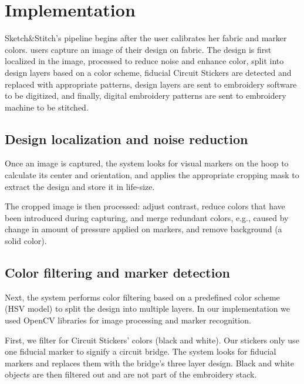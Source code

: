 \section{Implementation}
Sketch\&Stitch's pipeline begins after the user calibrates her fabric and marker colors. users capture an image of their design on fabric. The design is first localized in the image, processed to reduce noise and enhance color, split into design layers based on a color scheme, fiducial Circuit Stickers are detected and replaced with appropriate patterns, design layers are sent to embroidery software to be digitized, and finally, digital embroidery patterns are sent to embroidery machine to be stitched. 


\subsection{Design localization and noise reduction}
Once an image is captured, the system looks for visual markers on the hoop to calculate its center and orientation, and applies the appropriate cropping mask to extract the design and store it in life-size.

The cropped image is then processed: adjust contrast, reduce colors that have been introduced during capturing, and merge redundant colors, e.g., caused by change in amount of pressure applied on markers, and remove background (a solid color). 





\subsection{Color filtering and marker detection}
Next, the system performs color filtering based on a predefined color scheme (HSV model) to split the design into multiple layers. In our implementation we used OpenCV libraries for image processing and marker recognition. 

First, we filter for Circuit Stickers' colors (black and white). Our stickers only use one fiducial marker to signify a circuit bridge. The system looks for fiducial markers and replaces them with the bridge's three layer design. Black and white objects are then filtered out and are not part of the embroidery stack.

